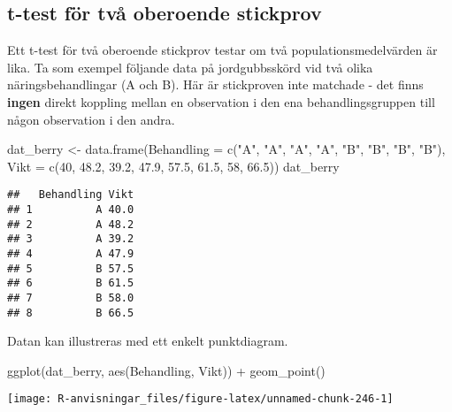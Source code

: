 \documentclass[
]{book}
\newenvironment{Shaded}{\begin{snugshade}}{\end{snugshade}}
\newcommand{\AttributeTok}[1]{\textcolor[rgb]{0.77,0.63,0.00}{#1}}
\newcommand{\DecValTok}[1]{\textcolor[rgb]{0.00,0.00,0.81}{#1}}
\newcommand{\FloatTok}[1]{\textcolor[rgb]{0.00,0.00,0.81}{#1}}
\newcommand{\FunctionTok}[1]{\textcolor[rgb]{0.00,0.00,0.00}{#1}}
\newcommand{\NormalTok}[1]{#1}
\newcommand{\OtherTok}[1]{\textcolor[rgb]{0.56,0.35,0.01}{#1}}
\newcommand{\SpecialCharTok}[1]{\textcolor[rgb]{0.00,0.00,0.00}{#1}}
\newcommand{\StringTok}[1]{\textcolor[rgb]{0.31,0.60,0.02}{#1}}
\theoremstyle{definition}
\theoremstyle{definition}
\theoremstyle{definition}
\theoremstyle{definition}
\theoremstyle{remark}
\begin{document}
\hypertarget{t-test-fuxf6r-tvuxe5-oberoende-stickprov}{%
\subsection{t-test för två oberoende stickprov}\label{t-test-fuxf6r-tvuxe5-oberoende-stickprov}}

Ett t-test för två oberoende stickprov testar om två populationsmedelvärden är lika. Ta som exempel följande data på jordgubbsskörd vid två olika näringsbehandlingar (A och B). Här är stickproven inte matchade - det finns \textbf{ingen} direkt koppling mellan en observation i den ena behandlingsgruppen till någon observation i den andra.

\begin{Shaded}
\begin{Highlighting}[]
\NormalTok{dat\_berry }\OtherTok{\textless{}{-}} \FunctionTok{data.frame}\NormalTok{(}\AttributeTok{Behandling =} \FunctionTok{c}\NormalTok{(}\StringTok{"A"}\NormalTok{, }\StringTok{"A"}\NormalTok{, }\StringTok{"A"}\NormalTok{, }\StringTok{"A"}\NormalTok{, }\StringTok{"B"}\NormalTok{, }\StringTok{"B"}\NormalTok{, }\StringTok{"B"}\NormalTok{, }\StringTok{"B"}\NormalTok{),}
              \AttributeTok{Vikt =} \FunctionTok{c}\NormalTok{(}\DecValTok{40}\NormalTok{, }\FloatTok{48.2}\NormalTok{, }\FloatTok{39.2}\NormalTok{, }\FloatTok{47.9}\NormalTok{, }\FloatTok{57.5}\NormalTok{, }\FloatTok{61.5}\NormalTok{, }\DecValTok{58}\NormalTok{, }\FloatTok{66.5}\NormalTok{))}
\NormalTok{dat\_berry}
\end{Highlighting}
\end{Shaded}

\begin{verbatim}
##   Behandling Vikt
## 1          A 40.0
## 2          A 48.2
## 3          A 39.2
## 4          A 47.9
## 5          B 57.5
## 6          B 61.5
## 7          B 58.0
## 8          B 66.5
\end{verbatim}

Datan kan illustreras med ett enkelt punktdiagram.

\begin{Shaded}
\begin{Highlighting}[]
\FunctionTok{ggplot}\NormalTok{(dat\_berry, }\FunctionTok{aes}\NormalTok{(Behandling, Vikt)) }\SpecialCharTok{+}
  \FunctionTok{geom\_point}\NormalTok{()}
\end{Highlighting}
\end{Shaded}

\begin{center}\texttt{[image: R-anvisningar\_files/figure-latex/unnamed-chunk-246-1]} \end{center}
\end{document}
